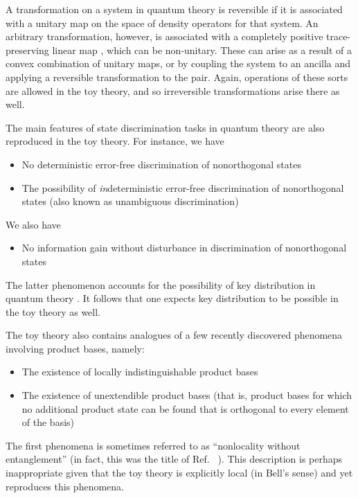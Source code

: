 \documentclass[pra,twocolumn,nofootinbib,showpacs]{revtex4}
\begin{document}
A transformation on a system in quantum theory is reversible if it is
associated with a unitary map on the space of density operators for that
system. An arbitrary transformation, however, is associated with a
completely positive trace-preserving linear map \cite{NielsenChuang}, which
can be non-unitary. These can arise as a result of a convex combination of
unitary maps, or by coupling the system to an ancilla and applying a
reversible transformation to the pair. Again, operations of these sorts are
allowed in the toy theory, and so irreversible transformations arise there
as well.

The main features of state discrimination tasks in quantum theory \cite%
{Cheflesreview} are also reproduced in the toy theory. For instance, we have

\begin{itemize}
\item No deterministic error-free discrimination of nonorthogonal states

\item The possibility of \emph{in}deterministic error-free discrimination of
nonorthogonal states (also known as unambiguous discrimination)
\end{itemize}

We also have

\begin{itemize}
\item No information gain without disturbance in discrimination of
nonorthogonal states
\end{itemize}

The latter phenomenon accounts for the possibility of key distribution in
quantum theory \cite{infogaintradeoff,BB84}. It follows that one expects key
distribution to be possible in the toy theory as well.

The toy theory also contains analogues of a few recently discovered
phenomena involving product bases, namely:

\begin{itemize}
\item The existence of locally indistinguishable product bases \cite%
{NLwoutentanglement}

\item The existence of unextendible product bases (that is, product bases
for which no additional product state can be found that is orthogonal to
every element of the basis) \cite{UPBs}
\end{itemize}

The first phenomena is sometimes referred to as ``nonlocality without
entanglement'' (in fact, this was the title of Ref.~\cite{NLwoutentanglement}%
). This description is perhaps inappropriate given that the toy theory is
explicitly local (in Bell's sense) and yet reproduces this phenomena.
\end{document}
